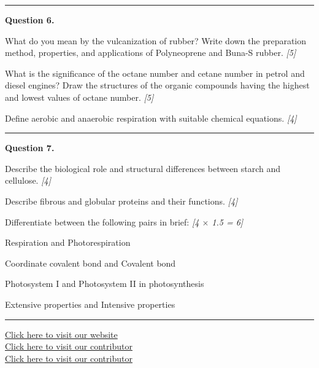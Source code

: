 \documentclass[11pt,a4paper]{article}
\newcommand{\pts}[1]{\hfill   \textit{[#1]}}
\begin{document}
\medskip\rule{\linewidth}{0.2pt}




\noindent   \textbf{Question 6.}

\begin{parts}
  \item What do you mean by the vulcanization of rubber? Write down the preparation method, properties, and applications of Polyneoprene and Buna-S rubber. \pts{5}
  \item What is the significance of the octane number and cetane number in petrol and diesel engines? Draw the structures of the organic compounds having the highest and lowest values of octane number. \pts{5}
  \item Define aerobic and anaerobic respiration with suitable chemical equations. \pts{4}
\end{parts}

\medskip\rule{\linewidth}{0.2pt}




\noindent   \textbf{Question 7.}

\begin{parts}
  \item Describe the biological role and structural differences between starch and cellulose. \pts{4}
  \item Describe fibrous and globular proteins and their functions. \pts{4}
  \item Differentiate between the following pairs in brief: \pts{4 $ \times$ 1.5 = 6}
  
\begin{parts}
    \item Respiration and Photorespiration
    \item Coordinate covalent bond and Covalent bond
    \item Photosystem I and Photosystem II in photosynthesis
    \item Extensive properties and Intensive properties
  \end{parts}
\end{parts}

\vfill
\rule{\linewidth}{0.4pt}

\begin{center}\small
  \href{https://bhu-exam.vercel.app/}{Click here to visit our website}\\[4pt]
  \href{https://me-aryan.vercel.app/}{Click here to visit our contributor}\\[4pt]
  \href{https://quashan-me.vercel.app/}{Click here to visit our contributor}
\end{center}
\end{document}

